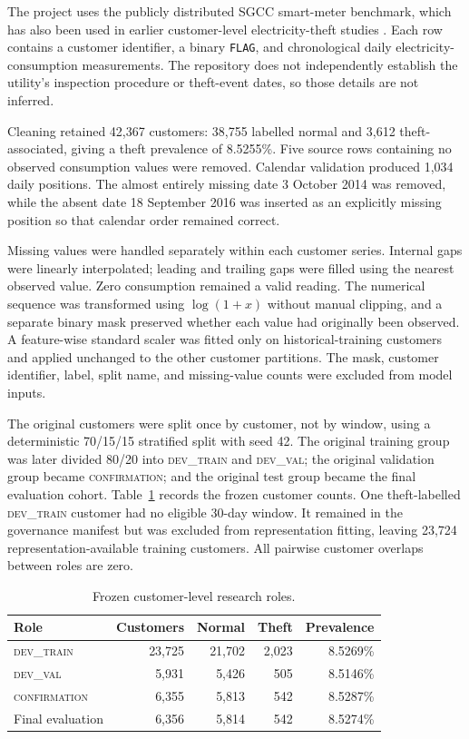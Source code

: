 The project uses the publicly distributed SGCC smart-meter benchmark, which has also been used in earlier customer-level electricity-theft studies \cite{Zheng2018WideDeep,Shehzad2022GeneticETD}. Each row contains a customer identifier, a binary \texttt{FLAG}, and chronological daily electricity-consumption measurements. The repository does not independently establish the utility's inspection procedure or theft-event dates, so those details are not inferred.

Cleaning retained 42,367 customers: 38,755 labelled normal and 3,612 theft-associated, giving a theft prevalence of 8.5255\%. Five source rows containing no observed consumption values were removed. Calendar validation produced 1,034 daily positions. The almost entirely missing date 3 October 2014 was removed, while the absent date 18 September 2016 was inserted as an explicitly missing position so that calendar order remained correct.

Missing values were handled separately within each customer series. Internal gaps were linearly interpolated; leading and trailing gaps were filled using the nearest observed value. Zero consumption remained a valid reading. The numerical sequence was transformed using $\log(1+x)$ without manual clipping, and a separate binary mask preserved whether each value had originally been observed. A feature-wise standard scaler was fitted only on historical-training customers and applied unchanged to the other customer partitions. The mask, customer identifier, label, split name, and missing-value counts were excluded from model inputs.

The original customers were split once by customer, not by window, using a deterministic 70/15/15 stratified split with seed 42. The original training group was later divided 80/20 into \textsc{dev\_train} and \textsc{dev\_val}; the original validation group became \textsc{confirmation}; and the original test group became the final evaluation cohort. Table~\ref{tab:cohorts} records the frozen customer counts. One theft-labelled \textsc{dev\_train} customer had no eligible 30-day window. It remained in the governance manifest but was excluded from representation fitting, leaving 23,724 representation-available training customers. All pairwise customer overlaps between roles are zero.

\begin{table}[ht]
\centering
\caption{Frozen customer-level research roles.}
\label{tab:cohorts}
\small
\begin{tabular}{@{}lrrrr@{}}
\toprule
Role & Customers & Normal & Theft & Prevalence \\
\midrule
\textsc{dev\_train} & 23,725 & 21,702 & 2,023 & 8.5269\% \\
\textsc{dev\_val} & 5,931 & 5,426 & 505 & 8.5146\% \\
\textsc{confirmation} & 6,355 & 5,813 & 542 & 8.5287\% \\
Final evaluation & 6,356 & 5,814 & 542 & 8.5274\% \\
\bottomrule
\end{tabular}
\end{table}


